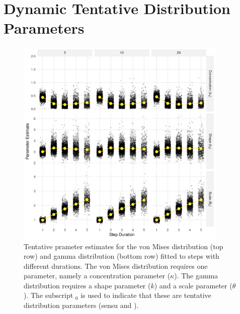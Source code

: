 \documentclass[abstract=on,10pt,a4paper,bibliography=totocnumbered]{article}
\begin{document}
\section{Dynamic Tentative Distribution Parameters}
\begin{figure}[!ht]
  \begin{center}
  \includegraphics[width = 0.9\textwidth]{99_DistributionParameters.png}
  \caption{Tentative prameter estimates for the von Mises distribution (top row) and
  gamma distribution (bottom row) fitted to steps with different durations. The
  von Mises distribution requires one parameter, namely a concentration
  parameter ($\kappa$). The gamma distribution requires a shape parameter ($k$)
  and a scale parameter ($\theta$). The subscript $_0$ is used to indicate that
  these are tentative distribution parameters (sensu \citealp{Avgar.2016} and
  \citealp{Fieberg.2021}).}
  \label{DistributionParameters}
  \end{center}
\end{figure}

\newpage
\end{document}
